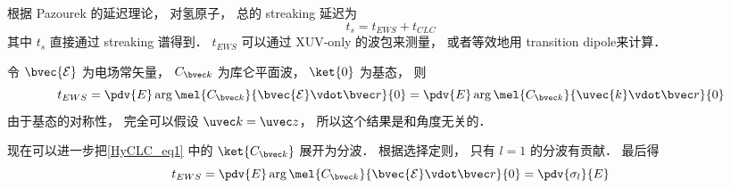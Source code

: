 
\begin{issues}
\issueDraft
\end{issues}


根据 Pazourek 的延迟理论， 对氢原子， 总的 streaking 延迟为
\begin{equation}
t_s = t_{EWS} + t_{CLC}
\end{equation}
其中 $t_s$ 直接通过 streaking 谱得到． $t_{EWS}$ 可以通过 XUV-only 的波包来测量， 或者等效地用 transition dipole来计算．

令 $\bvec{\mathcal E}$ 为电场常矢量， $C_{\bvec k}$ 为库仑平面波， $\ket{0}$ 为基态， 则
\begin{equation}\label{HyCLC_eq1}
t_{EWS} = \pdv{E} \arg \mel{C_{\bvec k}}{\bvec{\mathcal E}\vdot \bvec r}{0} = \pdv{E} \arg \mel{C_{\bvec k}}{\uvec{k}\vdot \bvec r}{0}
\end{equation}
由于基态的对称性， 完全可以假设 $\uvec k = \uvec z$， 所以这个结果是和角度无关的．

现在可以进一步把\autoref{HyCLC_eq1} 中的 $\ket{C_{\bvec k}}$ 展开为分波． 根据选择定则， 只有 $l = 1$ 的分波有贡献． 最后得
\begin{equation}\label{HyCLC_eq2}
t_{EWS} = \pdv{E} \arg \mel{C_{\bvec k}}{\bvec{\mathcal E}\vdot \bvec r}{0} = \pdv{\sigma_l}{E}
\end{equation}
